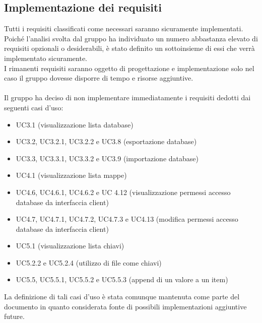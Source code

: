 \documentclass[a4paper]{article}
\begin{document}
	\subsection{Implementazione dei requisiti}
	Tutti i requisiti classificati come necessari saranno sicuramente implementati. 
	\\ Poiché l'analisi svolta dal gruppo ha individuato un numero abbastanza elevato di requisiti opzionali o desiderabili, è stato definito un sottoinsieme di essi che verrà implementato sicuramente.
	\\ I rimanenti requisiti saranno oggetto di progettazione e implementazione solo nel caso il gruppo dovesse disporre di tempo e risorse aggiuntive.
	\\ \\
	Il gruppo ha deciso di non implementare immediatamente i requisiti dedotti dai seguenti casi d'uso:
	\begin{itemize}
	\item UC3.1 (visualizzazione lista database)
	\item UC3.2, UC3.2.1, UC3.2.2 e UC3.8 (esportazione database)
	\item UC3.3, UC3.3.1, UC3.3.2 e UC3.9 (importazione database)
	\item UC4.1 (visualizzazione lista mappe)
	\item UC4.6, UC4.6.1, UC4.6.2 e UC 4.12 (visualizzazione permessi accesso database da interfaccia client)
	\item UC4.7, UC4.7.1, UC4.7.2, UC4.7.3 e UC4.13 (modifica permessi accesso database da interfaccia client)
	\item UC5.1 (visualizzazione lista chiavi)
	\item UC5.2.2 e UC5.2.4 (utilizzo di file come chiavi)
	\item UC5.5, UC5.5.1, UC5.5.2 e UC5.5.3 (append di un valore a un item)
	\end{itemize}
	La definizione di tali casi d'uso è stata comunque mantenuta come parte del documento in quanto considerata fonte di possibili implementazioni aggiuntive future.
	\cleardoublepage
	\listoffigures
	
	\cleardoublepage
	\listoftables
		
\end{document}

